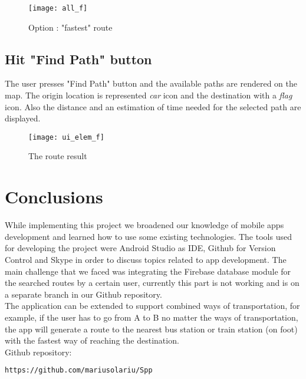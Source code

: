 \documentclass[11,titlepage]{article}
\begin{document}
	\begin{figure}[H]
		\begin{center}
		\texttt{[image: all\_f]}
		\caption{Option : "fastest" route}
		\end{center}
	\end{figure}
	
	\subsection{Hit "Find Path" button} 
	The user presses "Find Path" button and the available paths are rendered on the map. The origin location is represented \emph{car} icon and the destination with a \emph{flag} icon. Also the distance and an estimation of time needed for the selected path are displayed. 

	\begin{figure}[H]
		\begin{center}
		\texttt{[image: ui\_elem\_f]}
		\caption{The route result}
		\end{center}
	\end{figure}

\section{Conclusions}
	While implementing this project we broadened our knowledge of mobile apps development and learned how to use some existing
technologies. The tools used for developing the project were Android Studio as IDE, Github for Version Control and Skype in order to discuss topics related to app development. The main challenge that we faced was integrating the Firebase database module for the searched routes by a certain user, currently this part is not working and is on a separate branch in our Github repository.\\
	\indent The application can be extended to support combined ways of transportation, for example, if the user has to go from A to B no matter the ways of transportation, the app will generate a route to the nearest bus station or train station (on foot) with the fastest way of reaching the destination.\\
	
	Github repository:
	\begin{lstlisting}[language=html]
		https://github.com/mariusolariu/Spp
	\end{lstlisting}
	
\end{document}
